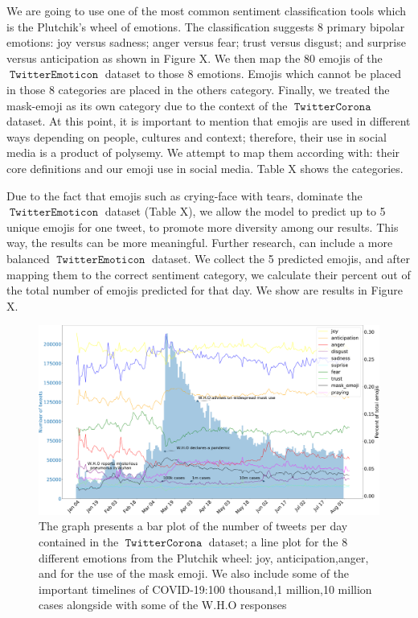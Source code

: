\documentclass[11pt]{article}
\DeclareMathOperator{\emoticon}{\texttt{TwitterEmoticon}}
\DeclareMathOperator{\corona}{\texttt{TwitterCorona}}
\begin{document}
We are going to use one of the most common sentiment classification tools which is the Plutchik's wheel of emotions.
The classification \cite{} suggests 8 primary bipolar emotions: joy versus sadness; anger versus fear; trust versus disgust; 
and surprise versus anticipation as shown in Figure X. We then map the 80 emojis of the $\emoticon$ dataset
to those 8 emotions. Emojis which cannot be placed in those 8 categories are placed in the others category. 
Finally, we treated the mask-emoji as its own category due to the context of the $\corona$ dataset.
At this point, it is important to mention that emojis are used in different ways depending on people, cultures and context;
therefore, their use in social media is a product of polysemy. We attempt to map them according with: their core definitions and
our emoji use in social media. Table X shows the categories.  

Due to the fact that emojis such as crying-face with tears, dominate the $\emoticon$ dataset (Table X),
we allow the model to predict up to 5 unique emojis for one tweet, to promote more diversity among our results.
This way, the results can be more meaningful. Further research, can include a more balanced $\emoticon$ dataset.
We collect the 5 predicted emojis, and after mapping them to the correct sentiment category, we calculate their 
percent out of the total number of emojis predicted for that day.
We show are results in Figure X. 


\begin{figure}[ht]
    \centering
    \includegraphics[width=\textwidth]{images/corona_dataset_graph.pdf}
    \caption{The graph presents a bar plot of the number of tweets per day contained in the $\corona$ dataset;
    a line plot for the 8 different emotions from the Plutchik wheel: joy, anticipation,anger, and for the use of the mask emoji.
    We also include some of the important timelines of COVID-19:100 thousand,1 million,10 million cases alongside with some of the W.H.O responses}
    \label{fig:tweets_per_day_sent}
\end{figure}
\end{document}
